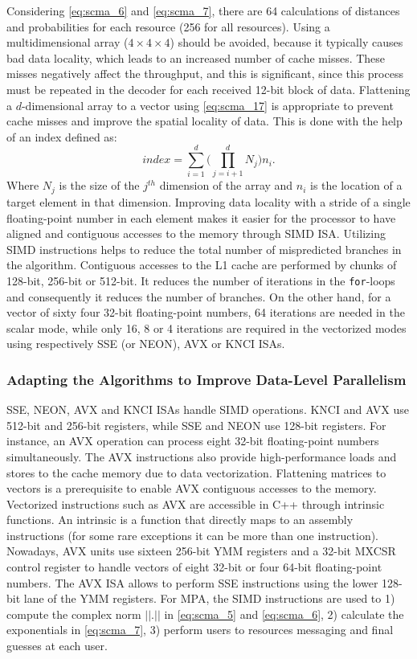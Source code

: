 Considering \eqref{eq:scma_6} and \eqref{eq:scma_7}, there are 64 calculations
of distances and probabilities for each resource (256 for all resources). Using
a multidimensional array ($4\times4\times4$) should be avoided, because it
typically causes bad data locality, which leads to an increased number of cache
misses. These misses negatively affect the throughput, and this is significant,
since this process must be repeated in the decoder for each received 12-bit
block of data. Flattening a $d$-dimensional array to a vector using
\eqref{eq:scma_17} is appropriate to prevent cache misses and improve the
spatial locality of data. This is done with the help of an index defined as:
\begin{equation}
  \label{eq:scma_17}
  index = \sum\limits_{i=1}^d\Bigg( \prod\limits_{j=i+1}^d N_j \Bigg)n_i.
\end{equation}
Where $N_j$ is the size of the $j^{th}$ dimension of the array and $n_i$ is the
location of a target element in that dimension. Improving data locality with
a stride of a single floating-point number in each element makes it easier for
the processor to have aligned and contiguous accesses to the memory through SIMD
ISA. Utilizing SIMD instructions helps to reduce the total number of
mispredicted branches in the algorithm. Contiguous accesses to the L1 cache are
performed by chunks of 128-bit, 256-bit or 512-bit. It reduces the number of
iterations in the \verb|for|-loops and consequently it reduces the number of
branches. On the other hand, for a vector of sixty four 32-bit floating-point
numbers, 64 iterations are needed in the scalar mode, while only 16, 8 or 4
iterations are required in the vectorized modes using respectively SSE (or
NEON), AVX or KNCI ISAs.

\subsubsection{Adapting the Algorithms to Improve Data-Level Parallelism}
\label{sec:scma_improvements_adapting_algorithms}

SSE, NEON, AVX and KNCI ISAs handle SIMD operations. KNCI and AVX use 512-bit
and 256-bit registers, while SSE and NEON use 128-bit registers. For instance,
an AVX operation can process eight 32-bit floating-point numbers simultaneously.
The AVX instructions also provide high-performance loads and stores to the cache
memory due to data vectorization. Flattening matrices to vectors is a
prerequisite to enable AVX contiguous accesses to the memory. Vectorized
instructions such as AVX are accessible in C++ through intrinsic functions. An
intrinsic is a function that directly maps to an assembly instructions (for some
rare exceptions it can be more than one instruction). Nowadays, AVX units use
sixteen 256-bit YMM registers and a 32-bit MXCSR control register to handle
vectors of eight 32-bit or four 64-bit floating-point numbers. The AVX ISA
allows to perform SSE instructions using the lower 128-bit lane of the YMM
registers. For MPA, the SIMD instructions are used to 1) compute the complex
norm $||.||$ in \eqref{eq:scma_5} and \eqref{eq:scma_6}, 2) calculate the
exponentials in \eqref{eq:scma_7}, 3) perform users to resources messaging and
final guesses at each user.

